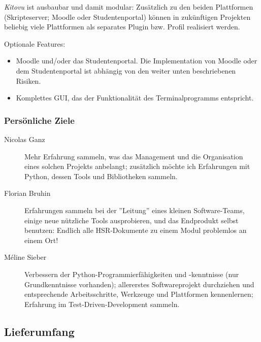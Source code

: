 \documentclass[a4paper]{article}
\begin{document}
\emph{Kitovu} ist ausbaubar und damit modular: Zusätzlich zu den beiden Plattformen (Skripteserver; Moodle oder Studentenportal) können in zukünftigen Projekten beliebig viele Plattformen als separates Plugin bzw. Profil realisiert werden.

Optionale Features:

\begin{itemize}
  \item Moodle und/oder das Studentenportal. Die Implementation von Moodle oder dem Studentenportal ist abhängig von den weiter unten beschriebenen Risiken.
  \item Komplettes GUI, das der Funktionalität des Terminalprogramms entspricht.
\end{itemize}

\subsubsection{Persönliche Ziele}
\begin{description}
\item[Nicolas Ganz] 
  Mehr Erfahrung sammeln, was das Management und die Organisation eines solchen Projekts anbelangt; zusätzlich möchte ich Erfahrungen mit Python, dessen Tools und Bibliotheken sammeln.
\item[Florian Bruhin] Erfahrungen sammeln bei der ''Leitung'' eines kleinen
  Software-Teams, einige neue nützliche Tools ausprobieren, und das Endprodukt selbst benutzen: Endlich alle HSR-Dokumente zu einem Modul problemlos an einem Ort!
\item[Méline Sieber] Verbessern der Python-Programmierfähigkeiten und -kenntnisse (nur Grundkenntnisse vorhanden); allererstes Softwareprojekt durchziehen und entsprechende Arbeitsschritte, Werkzeuge und Plattformen kennenlernen; Erfahrung im Test-Driven-Development sammeln.
\end{description}

\subsection{Lieferumfang}
\end{document}
